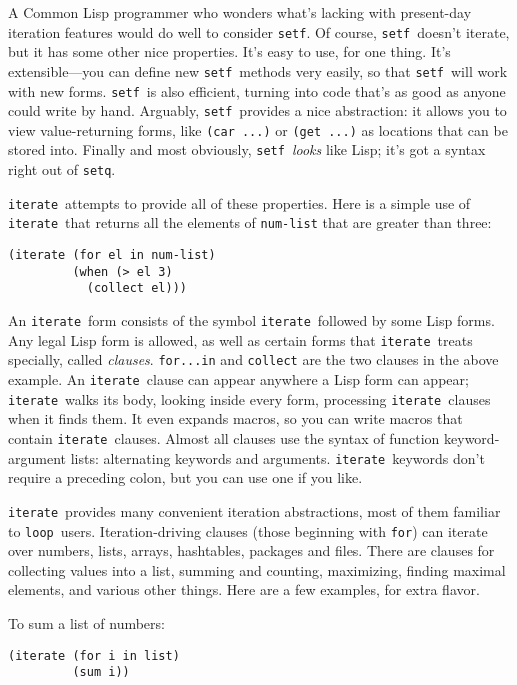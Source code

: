 \documentclass[12pt]{article}
\newcommand{\lisp}{\tt}
\newcommand{\iter}{{\lisp iterate}}
\newcommand{\looP}{{\lisp loop}}
\newcommand{\setf}{{\lisp setf}}
\begin{document}
A Common Lisp programmer who wonders what's lacking with present-day
iteration features would do well to consider \setf.  Of course,
\setf\ doesn't iterate, but it has some other nice properties.  It's
easy to use, for one thing.  It's extensible---you can define new
\setf\ methods very easily, so that \setf\ will work with new forms.
\setf\ is also efficient, turning into code that's as good as anyone
could write by hand.  Arguably, \setf\ provides a nice abstraction:
it allows you to view value-returning forms, like {\lisp (car ...)} or
{\lisp (get ...)} as locations that can be stored into.  Finally and
most obviously, \setf\ {\em looks\/} like Lisp; it's got a syntax
right out of {\lisp setq}.

\iter\ attempts to provide all of these properties.  Here is a simple
use of \iter\ that returns all the elements of {\lisp num-list}
that are greater than three:

\pagebreak[4]

\begin{verbatim}
(iterate (for el in num-list)
         (when (> el 3)
           (collect el)))
\end{verbatim}

An \iter\ form consists of the symbol \iter\ followed by some Lisp
forms.  Any legal Lisp form is allowed, as well as certain forms that
\iter\ treats specially, called {\em clauses}.  {\lisp for...in} and
{\lisp collect} are the two clauses in the above example.  An \iter\
clause can appear anywhere a Lisp form can appear; \iter\ walks its
body, looking inside every form, processing \iter\ clauses when it
finds them.  It even expands macros, so you can write macros that
contain \iter\ clauses.  Almost all clauses use the syntax of function
keyword-argument lists: alternating keywords and arguments.  \iter\
keywords don't require a preceding colon, but you can use one if you
like.

\iter\ provides many convenient iteration abstractions, most of
them familiar to \looP\ users.  Iteration-driving clauses (those
beginning with {\lisp for}) can iterate over numbers, lists, arrays,
hashtables, packages and files.  There are clauses for collecting
values into a list, summing and counting, maximizing, finding maximal
elements, and various other things.  Here are a few examples, for
extra flavor.

\pagebreak[2]
To sum a list of numbers:
\begin{verbatim}
(iterate (for i in list)
         (sum i))
\end{verbatim}
\end{document}
